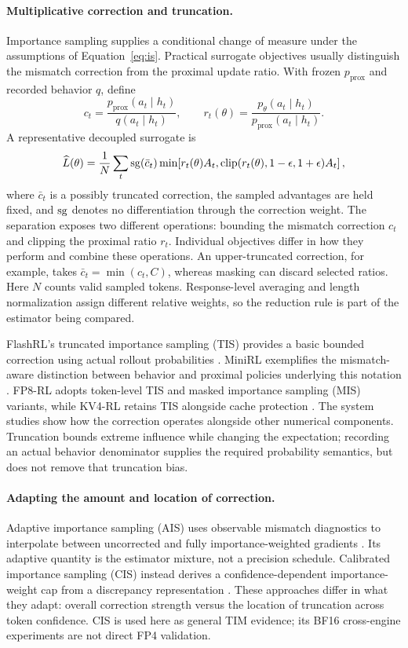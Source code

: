 \paragraph{Multiplicative correction and truncation.}
Importance sampling supplies a conditional change of measure under the assumptions of Equation~\eqref{eq:is}. Practical surrogate objectives usually distinguish the mismatch correction from the proximal update ratio. With frozen $p_{\mathrm{prox}}$ and recorded behavior $q$, define
\begin{equation}\label{eq:tworatios}
c_t=\frac{p_{\mathrm{prox}}(a_t\mid h_t)}{q(a_t\mid h_t)},\qquad
r_t(\theta)=\frac{p_\theta(a_t\mid h_t)}{p_{\mathrm{prox}}(a_t\mid h_t)}.
\end{equation}
A representative decoupled surrogate is
\begin{equation}\label{eq:surrogate}
\widehat L(\theta)=\frac1N\sum_t \operatorname{sg}(\bar c_t)
\min\!\left[r_t(\theta)A_t,\operatorname{clip}(r_t(\theta),1-\epsilon,1+\epsilon)A_t\right],
\end{equation}
where $\bar c_t$ is a possibly truncated correction, the sampled advantages are held fixed, and $\operatorname{sg}$ denotes no differentiation through the correction weight. The separation exposes two different operations: bounding the mismatch correction $c_t$ and clipping the proximal ratio $r_t$. Individual objectives differ in how they perform and combine these operations. An upper-truncated correction, for example, takes $\bar c_t=\min(c_t,C)$, whereas masking can discard selected ratios. Here $N$ counts valid sampled tokens. Response-level averaging and length normalization assign different relative weights, so the reduction rule is part of the estimator being compared.

FlashRL's truncated importance sampling (TIS) provides a basic bounded correction using actual rollout probabilities \citep{flashrl}. MiniRL exemplifies the mismatch-aware distinction between behavior and proximal policies underlying this notation \citep{minirl}. FP8-RL adopts token-level TIS and masked importance sampling (MIS) variants, while KV4-RL retains TIS alongside cache protection \citep{fp8rl,kv4}. The system studies show how the correction operates alongside other numerical components. Truncation bounds extreme influence while changing the expectation; recording an actual behavior denominator supplies the required probability semantics, but does not remove that truncation bias.

\paragraph{Adapting the amount and location of correction.}
Adaptive importance sampling (AIS) uses observable mismatch diagnostics to interpolate between uncorrected and fully importance-weighted gradients \citep{ais}. Its adaptive quantity is the estimator mixture, not a precision schedule. Calibrated importance sampling (CIS) instead derives a confidence-dependent importance-weight cap from a discrepancy representation \citep{cis}. These approaches differ in what they adapt: overall correction strength versus the location of truncation across token confidence. CIS is used here as general TIM evidence; its BF16 cross-engine experiments are not direct FP4 validation.

